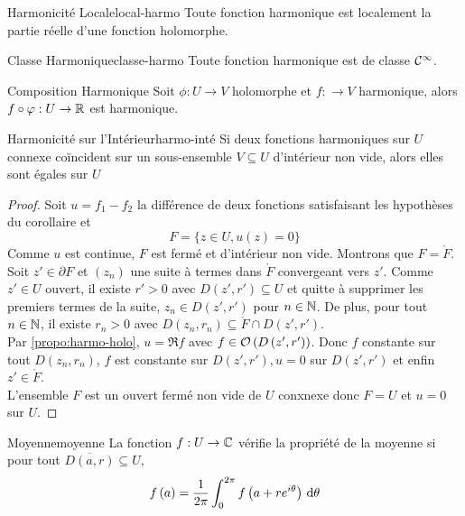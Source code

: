 \documentclass{cours}
\begin{document}
\begin{corollaire}
	{Harmonicité Locale}{local-harmo}
	Toute fonction harmonique est localement la partie réelle d'une fonction holomorphe.
\end{corollaire}

\begin{corollaire}
	{Classe Harmonique}{classe-harmo}
	Toute fonction harmonique est de classe $\mathcal{C}^{\infty}$.
\end{corollaire}

\begin{corollaire}
	{Composition Harmonique}{}
	Soit $\phi: U \to V$ holomorphe et $f : \to V$ harmonique, alors $f \circ \varphi : U \to \mathbb{R}$ est harmonique. 
\end{corollaire}

\begin{corollaire}
	{Harmonicité sur l'Intérieur}{harmo-inté}
	Si deux fonctions harmoniques sur $U$ connexe coïncident sur un sous-ensemble $V \subseteq U$ d'intérieur non vide, alors elles sont égales sur $U$
\end{corollaire}
\begin{proof}
	Soit $u = f_{1} - f_{2}$ la différence de deux fonctions satisfaisant les hypothèses du corollaire et 
	\begin{equation*}
		F = \{z \in U, u\left(z\right) = 0\}
	\end{equation*}
	Comme $u$ est continue, $F$ est fermé et d'intérieur non vide. 
	Montrons que $F = \mathring{F}$. Soit $z' \in \partial F$ et $\left(z_{n}\right)$ une suite à termes dans $\mathring{F}$ convergeant vers $z'$. 
	Comme $z' \in U$ ouvert, il existe $r' > 0$ avec $D\left(z', r'\right) \subseteq U$ et quitte à supprimer les premiers termes de la suite, $z_{n} \in D\left(z', r'\right)$ pour $n \in \mathbb{N}$. 
	De plus, pour tout $n \in \mathbb{N}$, il existe $r_{n} > 0$ avec $D\left(z_{n}, r_{n}\right) \subseteq \mathring{F} \cap D\left(z', r'\right)$.\\
	Par \ref{propo:harmo-holo}, $u = \Re f$ avec $f \in \mathcal{O}\left(D\left(z', r'\right)\right)$. Donc $f$ constante sur tout $D\left(z_{n}, r_{n}\right)$, $f$ est constante sur $D\left(z', r'\right), u = 0$ sur $D\left(z', r'\right)$ et enfin $z' \in \mathring{F}$.\\
	L'ensemble $F$ est un ouvert fermé non vide de $U$ conxnexe donc $F = U$ et $u = 0$ sur $U$.
\end{proof}

\begin{définition}
	{Moyenne}{moyenne}
	La fonction $f: U \to \mathbb{C}$ vérifie la propriété de la moyenne si pour tout $\overline{D\left(a, r\right)} \subseteq U$, 
	\begin{equation*}
		f\left(a\right) = \frac{1}{2\pi}\int_{0}^{2\pi} f\left(a+re^{i\theta}\right){\rm \, d} \theta
	\end{equation*}
\end{définition}
\end{document}
